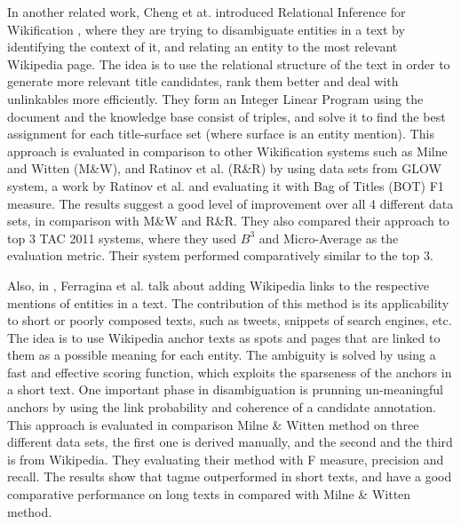 \documentclass[letterpaper]{article}
\begin{document}
 
In another related work, Cheng et at. introduced Relational Inference for Wikification \cite{cheng-2013}, where they are trying to disambiguate entities in a text by identifying the context of it, and relating an entity to the most relevant Wikipedia page. The idea is to use the relational structure of the text in order to generate more relevant title candidates, rank them better and deal with unlinkables more efficiently. They form an Integer Linear Program using the document and the knowledge base consist of triples, and solve it to find the best assignment for each title-surface set (where surface is an entity mention). This approach is evaluated in comparison to other Wikification systems such as Milne and Witten (M\&W), and Ratinov et al. (R\&R) by using data sets from GLOW system, a work by Ratinov et al. and evaluating it with Bag of Titles (BOT) F1 measure. The results suggest a good level of improvement over all 4 different data sets, in comparison with M\&W and R\&R. They also compared their approach to top 3 TAC 2011 systems, where they used $B^3$ and Micro-Average as the evaluation metric. Their system performed comparatively similar to the top 3.


Also, in \cite{tagme}, Ferragina et al. talk about adding Wikipedia links to the respective mentions of entities in a text. The contribution of this method is its applicability to short or poorly composed texts, such as tweets, snippets of search engines, etc. The idea is to use Wikipedia anchor texts as spots and pages that are linked to them as a possible meaning for each entity. The ambiguity is solved by using a fast and effective scoring function, which exploits the sparseness of the anchors in a short text. One important phase in disambiguation is prunning un-meaningful anchors by using the link probability and coherence of a candidate annotation. This approach is evaluated in comparison Milne \& Witten method on three different data sets, the first one is derived manually, and the second and the third is from Wikipedia. They evaluating their method with F measure, precision and recall. The results show that tagme outperformed in short texts, and have a good comparative performance on long texts in compared with Milne \& Witten method.
\end{document}
